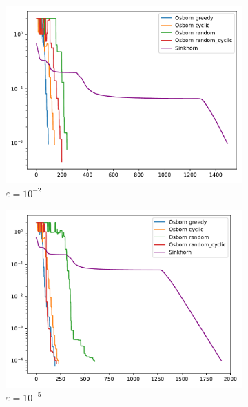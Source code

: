 \begin{figure}[H]
    \centering
    \begin{subfigure}[b]{.18\textwidth}
        \centering
        \includegraphics[width=\textwidth]{figures/dist2_0.001/osborn_vs_sinkhorn_dist2_0.001_0.01}
        \caption{\(\varepsilon = 10^{-2}\)}
    \end{subfigure}
    \hfill
    \begin{subfigure}[b]{.18\textwidth}
        \centering
        \includegraphics[width=\textwidth]{figures/dist2_0.001/osborn_vs_sinkhorn_dist2_0.001_0.0001}
        \caption{\(\varepsilon = 10^{-5}\)}
    \end{subfigure}
    \hfill
    \begin{subfigure}[b]{.18\textwidth}

\end{subfigure}
\end{figure}
